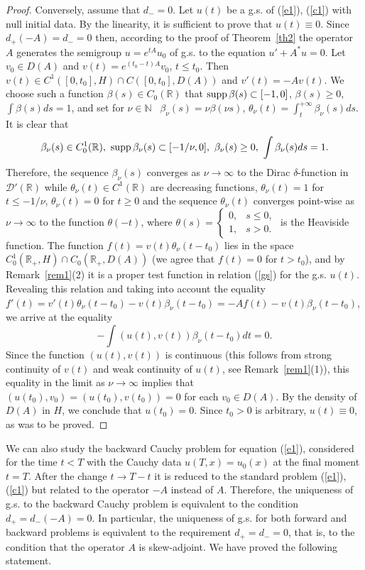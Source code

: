 \documentclass[12pt]{article}
\newcommand{\R}{{\mathbb R}}
\newcommand{\N}{{\mathbb N}}
\newcommand{\D}{{\mathcal D}}
\newcommand{\supp}{\mathop{\rm supp}}
\numberwithin{equation}{section}
\theoremstyle{plain}
\theoremstyle{definition}
\begin{document}
\begin{proof}
Conversely, assume that $d_-=0$. Let $u(t)$ be a g.s. of (\ref{e1}), (\ref{c1}) with null initial data. By the linearity,
it is sufficient to prove that $u(t)\equiv 0$. Since $d_+(-A)=d_-=0$ then, according to the proof of Theorem~\ref{th2} the operator $A$ generates the semigroup  $u=e^{tA}u_0$ of g.s. to the equation $u'+A^*u=0$. Let $v_0\in D(A)$ and $v(t)=e^{(t_0-t)A}v_0$, $t\le t_0$. Then $v(t)\in C^1([0,t_0],H)\cap C([0,t_0],D(A))$ and $v'(t)=-Av(t)$.
We choose such a function $\beta(s)\in C_0(\R)$ that $\supp\beta(s)\subset [-1,0]$, $\beta(s)\ge 0$, $\displaystyle\int\beta(s)ds=1$, and set for ${\nu\in\N}$  \ $\beta_\nu(s)=\nu\beta(\nu s)$,
$\displaystyle\theta_\nu(t)=\int_t^{+\infty} \beta_\nu(s)ds$. It is clear that
\[\beta_\nu(s)\in C_0^1(\R), \ \supp\beta_\nu(s)\subset [-1/\nu,0], \ \beta_\nu(s)\ge 0, \ \int\beta_\nu(s)ds=1.\] Therefore, the sequence $\beta_\nu(s)$ converges as $\nu\to\infty$ to the Dirac
$\delta$-function in $\D'(\R)$ while $\theta_\nu(t)\in C^1(\R)$ are decreasing functions, $\theta_\nu(t)=1$ for $t\le -1/\nu$, $\theta_\nu(t)=0$ for $t\ge 0$ and the sequence $\theta_\nu(t)$ converges point-wise as $\nu\to\infty$ to the function $\theta(-t)$, where $\displaystyle\theta(s)=\left\{\begin{array}{ll} 0, & s\le 0, \\ 1, & s>0.
\end{array}\right. $ is the Heaviside function. The function $f(t)=v(t)\theta_\nu(t-t_0)$ lies in the space  $C_0^1(\R_+,H)\cap C_0(\R_+,D(A))$ (we agree that $f(t)=0$ for $t>t_0$), and by Remark~\ref{rem1}(2) it is a proper test function in relation (\ref{gs}) for the g.s. $u(t)$. Revealing this relation and taking into account the equality $f'(t)=v'(t)\theta_\nu(t-t_0)-v(t)\beta_\nu(t-t_0)=-Af(t)-v(t)\beta_\nu(t-t_0)$, we arrive at the equality
\[
-\int (u(t),v(t))\beta_\nu(t-t_0)dt=0.
\]
Since the function $(u(t),v(t))$ is continuous (this follows from strong continuity of $v(t)$ and weak continuity of $u(t)$, see Remark~\ref{rem1}(1)), this equality in the limit as $\nu\to\infty$ implies that $(u(t_0),v_0)=(u(t_0),v(t_0))=0$ for each $v_0\in D(A)$. By the density of $D(A)$ in $H$, we conclude that $u(t_0)=0$.  Since $t_0>0$ is arbitrary, $u(t)\equiv 0$, as was to be proved.
\end{proof}

We can also study the backward Cauchy problem for equation (\ref{e1}), considered for the time $t<T$ with the Cauchy data
$u(T,x)=u_0(x)$ at the final moment $t=T$. After the change $t\to T-t$ it is reduced to the standard problem (\ref{e1}), (\ref{c1}) but related to the operator $-A$ instead of $A$. Therefore, the uniqueness of g.s. to the backward Cauchy problem is equivalent to the condition $d_+=d_-(-A)=0$. In particular, the uniqueness of g.s. for both forward and backward
problems is equivalent to the requirement $d_+=d_-=0$, that is, to the condition that the operator $A$ is skew-adjoint.
We have proved the following statement.
\end{document}
